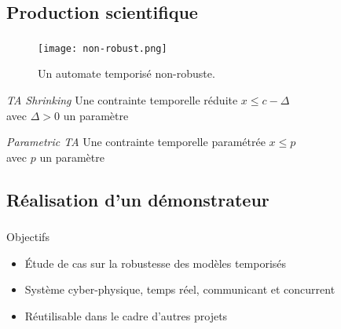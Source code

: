 \documentclass{beamer}
\begin{document}
    \subsection{Production scientifique}
      \begin{frame}
        \frametitle{\secname}
        \framesubtitle{\subsecname}
              
        \begin{figure}
          \centering
          \texttt{[image: non-robust.png]}
          \caption{Un automate temporisé non-robuste.}
        \end{figure}

        \vspace{1em}\pause
        \begin{block}{{\footnotesize\cite{sankur14}} {\it TA Shrinking}}
          \small
          Une contrainte temporelle réduite \hfill $x \leq c - \Delta$ \\
          avec $\Delta > 0$ un paramètre
        \end{block}

        \vspace{1em}\pause
        \begin{block}{{\footnotesize\cite{jovanovic14}} {\it Parametric TA}}
          \small
          Une contrainte temporelle paramétrée \hfill $x \leq p$ \\
          avec $p$ un paramètre
        \end{block}
        \vspace{3em}        
      \end{frame}

    \subsection{Réalisation d'un démonstrateur}
      \begin{frame}
        \frametitle{\secname}
        \framesubtitle{\subsecname}

        \small
        \begin{block}{Objectifs}
          \begin{itemize}
            \item Étude de cas sur la robustesse des modèles temporisés
            \item Système cyber-physique, temps réel, communicant et concurrent
            \item Réutilisable dans le cadre d'autres projets
          \end{itemize}
        \end{block}
      \end{frame}
\end{document}
